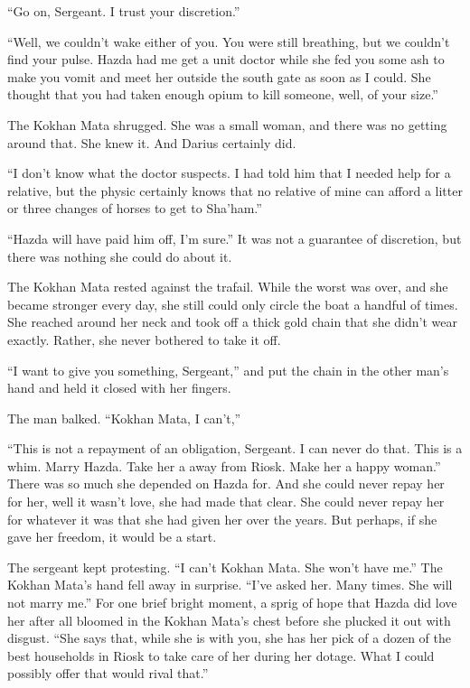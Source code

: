 \documentclass{article}
\begin{document}
	“Go on, Sergeant. I trust your discretion.” 
	
	“Well, we couldn’t wake either of you. You were still breathing, but we couldn’t find your pulse. Hazda had me get a unit doctor while she fed you some ash to make you vomit and meet her outside the south gate as soon as I could. She thought that you had taken enough opium to kill someone, well, of your size.” 
	
	The Kokhan Mata shrugged. She was a small woman, and there was no getting around that. She knew it. And Darius certainly did.
	
	“I don’t know what the doctor suspects. I had told him that I needed help for a relative, but the physic certainly knows that no relative of mine can afford a litter or three changes of horses to get to Sha’ham.”
	
	“Hazda will have paid him off, I’m sure.” It was not a guarantee of discretion, but there was nothing she could do about it.
	
	The Kokhan Mata rested against the trafail. While the worst was over, and she became stronger every day, she still could only circle the boat a handful of times. She reached around her neck and took off a thick gold chain that she didn’t wear exactly. Rather, she never bothered to take it off.
	
	“I want to give you something, Sergeant,” and put the chain in the other man’s hand and held it closed with her fingers. 
	
	The man balked. “Kokhan Mata, I can’t,”
	
	“This is not a repayment of an obligation, Sergeant. I can never do that. This is a whim. Marry Hazda. Take her a away from Riosk. Make her a happy woman.” There was so much she depended on Hazda for. And she could never repay her for her, well it wasn’t love, she had made that clear. She could never repay her for whatever it was that she had given her over the years. But perhaps, if she gave her freedom, it would be a start.
	
	The sergeant kept protesting. “I can’t Kokhan Mata. She won’t have me.” The Kokhan Mata’s hand fell away in surprise. “I’ve asked her. Many times. She will not marry me.” For one brief bright  moment, a sprig of hope that Hazda did love her after all bloomed in the Kokhan Mata’s chest before she plucked it out with disgust. “She says that, while she is with you, she has her pick of a dozen of the best households in Riosk to take care of her during her dotage. What I could possibly offer that would rival that.” 
	
\end{document}
